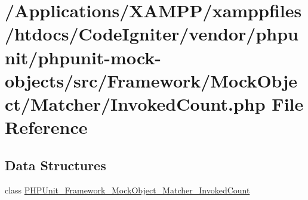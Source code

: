 \hypertarget{_invoked_count_8php}{}\section{/\+Applications/\+X\+A\+M\+P\+P/xamppfiles/htdocs/\+Code\+Igniter/vendor/phpunit/phpunit-\/mock-\/objects/src/\+Framework/\+Mock\+Object/\+Matcher/\+Invoked\+Count.php File Reference}
\label{_invoked_count_8php}
\subsection*{Data Structures}
\begin{DoxyCompactItemize}
\item 
class \mbox{\hyperlink{class_p_h_p_unit___framework___mock_object___matcher___invoked_count}{P\+H\+P\+Unit\+\_\+\+Framework\+\_\+\+Mock\+Object\+\_\+\+Matcher\+\_\+\+Invoked\+Count}}
\end{DoxyCompactItemize}
